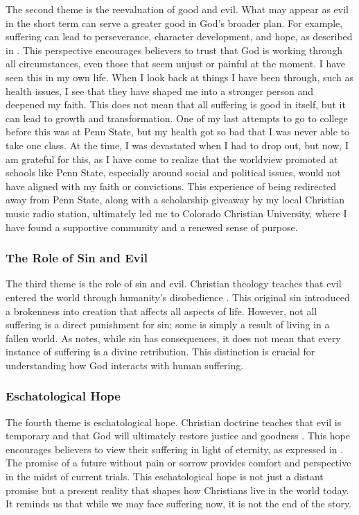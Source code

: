 \documentclass[stu,12pt,floatsintext]{apa7}
\begin{document}
The second theme is the reevaluation of good and evil. What may appear as evil in the short term can serve a greater good in God's broader plan. For example, suffering can lead to perseverance, character development, and hope, as described in \textcite[Romans 5:3-5]{Tyndale1996}. This perspective encourages believers to trust that God is working through all circumstances, even those that seem unjust or painful at the moment. I have seen this in my own life. When I look back at things I have been through, such as health issues, I see that they have shaped me into a stronger person and deepened my faith. This does not mean that all suffering is good in itself, but it can lead to growth and transformation. One of my last attempts to go to college before this was at Penn State, but my health got so bad that I was never able to take one class. At the time, I was devastated when I had to drop out, but now, I am grateful for this, as I have come to realize that the worldview promoted at schools like Penn State, especially around social and political issues, would not have aligned with my faith or convictions. This experience of being redirected away from Penn State, along with a scholarship giveaway by my local Christian music radio station, ultimately led me to Colorado Christian University, where I have found a supportive community and a renewed sense of purpose.

\subsubsection{The Role of Sin and Evil}

The third theme is the role of sin and evil. Christian theology teaches that evil entered the world through humanity's disobedience \parencite[Genesis 3]{Tyndale1996}. This original sin introduced a brokenness into creation that affects all aspects of life. However, not all suffering is a direct punishment for sin; some is simply a result of living in a fallen world. As \textcite[chapter 15]{ericksonIntroducingChristianDoctrine2015} notes, while sin has consequences, it does not mean that every instance of suffering is a divine retribution. This distinction is crucial for understanding how God interacts with human suffering.

\subsubsection{Eschatological Hope}

The fourth theme is eschatological hope. Christian doctrine teaches that evil is temporary and that God will ultimately restore justice and goodness \parencite[Revelation 21:4]{Tyndale1996}. This hope encourages believers to view their suffering in light of eternity, as expressed in \textcite[Romans 8:18]{Tyndale1996}. The promise of a future without pain or sorrow provides comfort and perspective in the midst of current trials. This eschatological hope is not just a distant promise but a present reality that shapes how Christians live in the world today. It reminds us that while we may face suffering now, it is not the end of the story.
\end{document}
